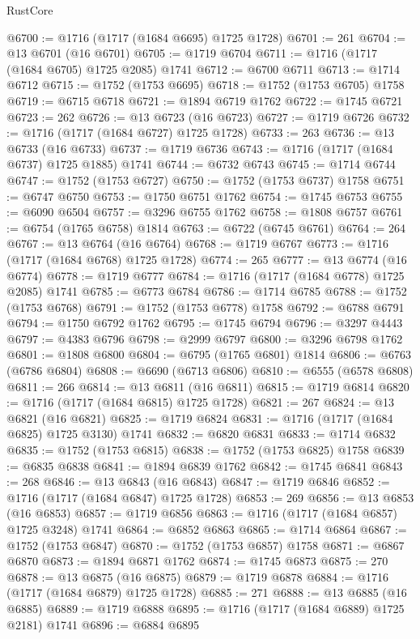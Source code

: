 \begin{lexlean}{RustCore}
\begin{coremodule}
@6700 := @1716 (@1717 (@1684 @6695) @1725 @1728)
@6701 := 261
@6704 := @13 @6701 (@16 @6701)
@6705 := @1719 @6704
@6711 := @1716 (@1717 (@1684 @6705) @1725 @2085) @1741
@6712 := @6700 @6711
@6713 := @1714 @6712
@6715 := @1752 (@1753 @6695)
@6718 := @1752 (@1753 @6705) @1758
@6719 := @6715 @6718
@6721 := @1894 @6719 @1762
@6722 := @1745 @6721
@6723 := 262
@6726 := @13 @6723 (@16 @6723)
@6727 := @1719 @6726
@6732 := @1716 (@1717 (@1684 @6727) @1725 @1728)
@6733 := 263
@6736 := @13 @6733 (@16 @6733)
@6737 := @1719 @6736
@6743 := @1716 (@1717 (@1684 @6737) @1725 @1885) @1741
@6744 := @6732 @6743
@6745 := @1714 @6744
@6747 := @1752 (@1753 @6727)
@6750 := @1752 (@1753 @6737) @1758
@6751 := @6747 @6750
@6753 := @1750 @6751 @1762
@6754 := @1745 @6753
@6755 := @6090 @6504
@6757 := @3296 @6755 @1762
@6758 := @1808 @6757
@6761 := @6754 (@1765 @6758) @1814
@6763 := @6722 (@6745 @6761)
@6764 := 264
@6767 := @13 @6764 (@16 @6764)
@6768 := @1719 @6767
@6773 := @1716 (@1717 (@1684 @6768) @1725 @1728)
@6774 := 265
@6777 := @13 @6774 (@16 @6774)
@6778 := @1719 @6777
@6784 := @1716 (@1717 (@1684 @6778) @1725 @2085) @1741
@6785 := @6773 @6784
@6786 := @1714 @6785
@6788 := @1752 (@1753 @6768)
@6791 := @1752 (@1753 @6778) @1758
@6792 := @6788 @6791
@6794 := @1750 @6792 @1762
@6795 := @1745 @6794
@6796 := @3297 @4443
@6797 := @4383 @6796
@6798 := @2999 @6797
@6800 := @3296 @6798 @1762
@6801 := @1808 @6800
@6804 := @6795 (@1765 @6801) @1814
@6806 := @6763 (@6786 @6804)
@6808 := @6690 (@6713 @6806)
@6810 := @6555 (@6578 @6808)
@6811 := 266
@6814 := @13 @6811 (@16 @6811)
@6815 := @1719 @6814
@6820 := @1716 (@1717 (@1684 @6815) @1725 @1728)
@6821 := 267
@6824 := @13 @6821 (@16 @6821)
@6825 := @1719 @6824
@6831 := @1716 (@1717 (@1684 @6825) @1725 @3130) @1741
@6832 := @6820 @6831
@6833 := @1714 @6832
@6835 := @1752 (@1753 @6815)
@6838 := @1752 (@1753 @6825) @1758
@6839 := @6835 @6838
@6841 := @1894 @6839 @1762
@6842 := @1745 @6841
@6843 := 268
@6846 := @13 @6843 (@16 @6843)
@6847 := @1719 @6846
@6852 := @1716 (@1717 (@1684 @6847) @1725 @1728)
@6853 := 269
@6856 := @13 @6853 (@16 @6853)
@6857 := @1719 @6856
@6863 := @1716 (@1717 (@1684 @6857) @1725 @3248) @1741
@6864 := @6852 @6863
@6865 := @1714 @6864
@6867 := @1752 (@1753 @6847)
@6870 := @1752 (@1753 @6857) @1758
@6871 := @6867 @6870
@6873 := @1894 @6871 @1762
@6874 := @1745 @6873
@6875 := 270
@6878 := @13 @6875 (@16 @6875)
@6879 := @1719 @6878
@6884 := @1716 (@1717 (@1684 @6879) @1725 @1728)
@6885 := 271
@6888 := @13 @6885 (@16 @6885)
@6889 := @1719 @6888
@6895 := @1716 (@1717 (@1684 @6889) @1725 @2181) @1741
@6896 := @6884 @6895

\end{coremodule}
\end{lexlean}
